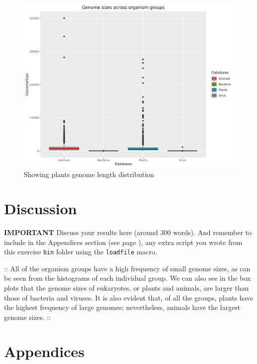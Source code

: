 \documentclass[10pt,a4paper,]{article}
\begin{document}
\begin{figure}
\centering
\includegraphics{images/genome_boxplot_comparison.png}
\caption{Showing plants genome length distribution}
\end{figure}

\hypertarget{discussion}{%
\section{Discussion}\label{discussion}}

\label{sec:discussion}

\textbf{IMPORTANT} Discuss your results here (around 300 words). And
remember to include in the Appendices section (see page
\pageref{sec:appendices}), any extra script you wrote from this exercise
\texttt{bin} folder using the \texttt{loadfile} macro.

:: All of the organism groups have a high frequency of small genome
sizes, as can be seen from the histograms of each individual group. We
can also see in the box plots that the genome sizes of eukaryotes, or
plants and animals, are larger than those of bacteria and viruses. It is
also evident that, of all the groups, plants have the highest frequency
of large genomes; nevertheless, animals have the largest genome sizes.
::

\clearpage

\hypertarget{appendices}{%
\section{Appendices}\label{appendices}}
\end{document}
